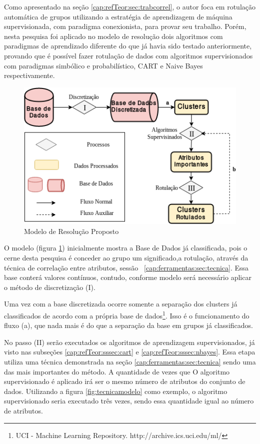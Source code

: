 Como apresentado na seção \ref{cap:refTeor:sec:trabcorrel}, o autor  foca em rotulação automática de grupos utilizando a estratégia de aprendizagem de máquina supervisionada, com paradigma conexionista, para provar seu trabalho. Porém, nesta pesquisa foi aplicado no modelo de resolução  dois algoritmos com paradigmas de aprendizado diferente do que já havia sido testado anteriormente, provando que é possível fazer rotulação de dados com  algoritmos supervisionados com paradigmas simbólico e probabilístico, CART e Naive Bayes respectivamente.


\begin{figure}[h!]
        \centering
        \includegraphics[scale=0.7]{figs/modeloResolucao.png}
        \caption{Modelo de Resolução Proposto} \label{fig:modeloresolucao}
\end{figure}

O modelo (figura \ref{fig:modeloresolucao}) inicialmente mostra a Base de Dados  já classificada, pois o cerne desta pesquisa é conceder ao grupo um significado,a rotulação,  através da técnica de correlação entre atributos, sessão ~\ref{cap:ferramentas:sec:tecnica}. Essa base  conterá  valores contínuos, contudo, conforme modelo será necessário aplicar o método de discretização (I).

Uma vez com a base discretizada ocorre somente a separação dos clusters já classificados de acordo com a própria base de dados\footnote{UCI - Machine Learning Repository. http://archive.ics.uci.edu/ml/ }. Isso é o funcionamento do fluxo (a), que nada mais é do que a separação da base em grupos já classificados.

No passo (II) serão executados os algoritmos de aprendizagem supervisionados, já visto nas subseções \ref{cap:refTeor:sssec:cart} e \ref{cap:refTeor:sssec:nbayes}. Essa etapa utiliza uma técnica demonstrada na seção  \ref{cap:ferramentas:sec:tecnica} sendo uma das mais importantes do método. A quantidade de vezes que O algoritmo supervisionado é aplicado irá ser o mesmo número de atributos do conjunto de dados. Utilizando a figura \ref{fig:tecnicamodelo} como exemplo, o algoritmo supervisionado seria executado três vezes, sendo essa quantidade igual ao número de atributos. 

